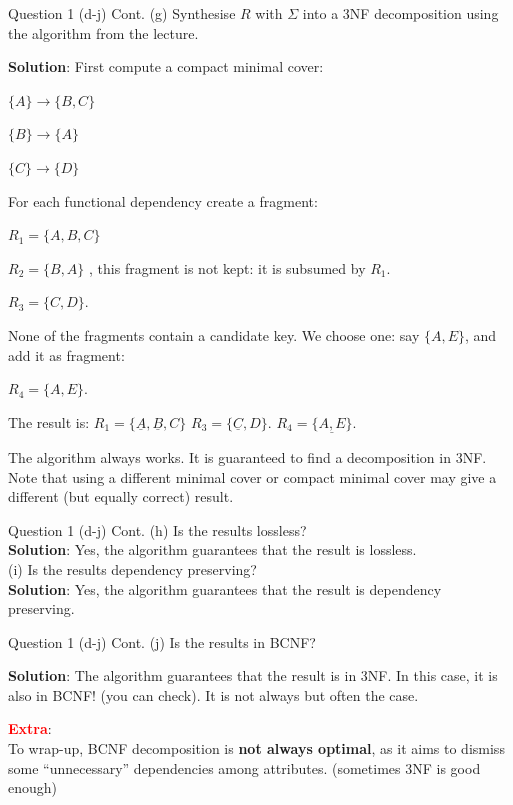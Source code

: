 \begin{frame}[fragile]{Question 1 (d-j) Cont.}
(g) Synthesise $R$ with $\Sigma$ into a 3NF decomposition using the algorithm from the lecture.\\\vspace{5pt}

\textbf{Solution}:
First compute a compact minimal cover:

$\{A\} \rightarrow \{B, C\}$

$\{B\} \rightarrow \{A\}$

$\{C\} \rightarrow \{D\}$

For each functional dependency create a fragment:

$R_1 = \{A, B, C\}$

$R_2 = \{B, A\}$ , this fragment is not kept: it is subsumed by $R_1$.

$R_3 = \{C, D\}$.

None of the fragments contain a candidate key. We choose one: say $\{A, E\}$, and add it as fragment:

$R_4 = \{A, E\}$.

The result is:
$R_1 = \{\underline{A}, \underline{B}, C\}$
$R_3 = \{\underline{C}, D\}$.
$R_4 = \{\underline{A, E}\}$.

The algorithm always works. It is guaranteed to find a decomposition in 3NF. Note that using a different minimal cover or compact minimal cover may give a different (but equally correct) result.
\end{frame}

\begin{frame}[fragile]{Question 1 (d-j) Cont.}
(h) Is the results lossless?\\\vspace{5pt}
\textbf{Solution}: Yes, the algorithm guarantees that the result is lossless.
\\\vspace{30pt}
(i) Is the results dependency preserving?\\\vspace{5pt}
\textbf{Solution}:
Yes, the algorithm guarantees that the result is dependency preserving.

\end{frame}

\begin{frame}[fragile]{Question 1 (d-j) Cont.}
(j) Is the results in BCNF?\\\vspace{5pt}

\textbf{Solution}:
The algorithm guarantees that the result is in 3NF. In this case, it is also in BCNF! (you can check). It is not always but often the case.\\\vspace{10pt}

\textcolor{red}{\textbf{Extra}}:\\
To wrap-up, BCNF decomposition is \textbf{not always optimal}, as it aims to dismiss some ``unnecessary'' dependencies among attributes. (sometimes 3NF is good enough)\\\vspace{5pt}
\end{frame}


